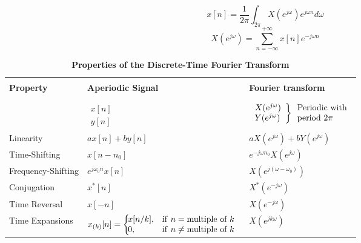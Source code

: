 \documentclass[12pt]{article}
\numberwithin{equation}{section}
\begin{document}
\begin{table}[htb]
\vspace*{-1.25in}
\caption{\bf Properties of the Discrete-Time Fourier Transform}
\vspace*{-0.4in}
\begin{center}
$$ x[n] = \frac{1}{2\pi} \int_{2\pi} X(e^{j\omega}) e^{j\omega n} d\omega$$
$$ X(e^{j\omega}) = \sum_{n = -\infty}^{+\infty} x[n] e^{-j\omega n}$$
\hspace*{-5.5pc}
\begin{tabular}{p{2.0in}ll}\hline
& &\\
 {\bf Property}
  & {\bf Aperiodic Signal}
  & {\bf Fourier transform} \\
 & & \\ \hline
 & &\\
 & $\displaystyle \begin{array}{l}
   x[n] \\
   y[n]
\end{array}$
  & $\displaystyle \left. \begin{array}{l}
    X(e^{j\omega}) \\
    Y(e^{j\omega})
  \end{array} \right\} \begin{array}{l}
    {\rm Periodic\ with}\\
    {\rm period\ } 2\pi
  \end{array}$ \\
   Linearity
  & $\displaystyle ax[n]+by[n]$
  & $\displaystyle aX(e^{j\omega}) + bY(e^{j\omega})$ \\
   Time-Shifting
  & $\displaystyle x[n-n_{0}]$
  & $\displaystyle e^{-j\omega n_{0}} X(e^{j\omega})$ \\
   Frequency-Shifting
  & $\displaystyle e^{j\omega_{0}n}x[n]$
  & $\displaystyle X(e^{j(\omega - \omega_0)} )$ \\
   Conjugation
  & $\displaystyle x^{*}[n]$
  & $\displaystyle X^{*}(e^{-j\omega})$ \\
   Time Reversal
  & $\displaystyle x[-n]$
  & $\displaystyle X(e^{-j\omega})$ \\
   Time Expansions
  & $\displaystyle x_{(k)}[n] = \left\{ \!\!\!\!
    \begin{array}{ll}
      x[n/k], & {\rm if~} n =    \mbox{multiple of } k\\
      0,      & {\rm if~} n \neq \mbox{multiple of } k
    \end{array}\right.$
  & $\displaystyle X(e^{jk\omega})$ \\

\end{tabular}
\end{center}
\end{table}
\end{document}
